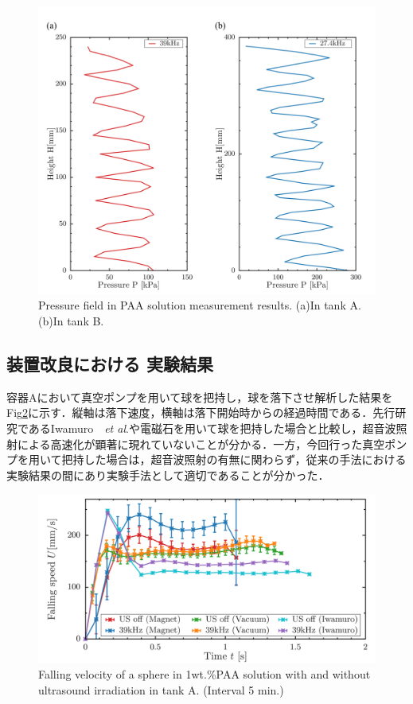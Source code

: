 \begin{figure}[ht]
    \centering
    \includegraphics[width=12cm,clip]{4-Results/press.png}
    \caption{Pressure field in PAA solution measurement results. (a)In tank A. (b)In tank B.}
    \label{fig:pressure}
\end{figure}

\newpage

\subsection{装置改良における 実験結果}

容器Aにおいて真空ポンプを用いて球を把持し，球を落下させ解析した結果をFig\ref{fig:falling-A}に示す．縦軸は落下速度，横軸は落下開始時からの経過時間である．先行研究であるIwamuro　\textit{et al}.\cite{ref:8}や電磁石を用いて球を把持した場合と比較し，超音波照射による高速化が顕著に現れていないことが分かる．一方，今回行った真空ポンプを用いて把持した場合は，超音波照射の有無に関わらず，従来の手法における実験結果の間にあり実験手法として適切であることが分かった．

\begin{figure}[ht]
    \centering
    \includegraphics[width=12cm,clip]{./4-Results/s1-A.png}
    \caption{Falling velocity of a sphere in 1wt.\%PAA solution with and without ultrasound irradiation in tank A. (Interval 5 min.)}
    \label{fig:falling-A}
\end{figure}

